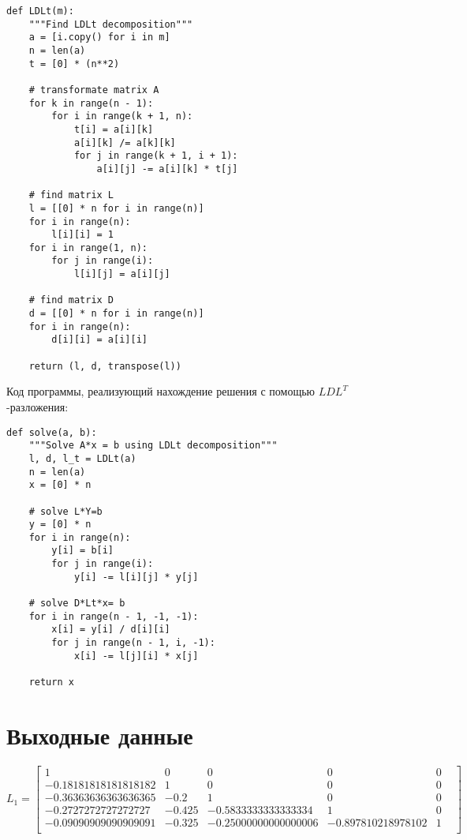 \documentclass[12pt]{report}
\begin{document}
\begin{lstlisting}
def LDLt(m):
    """Find LDLt decomposition"""
    a = [i.copy() for i in m]
    n = len(a)
    t = [0] * (n**2)

    # transformate matrix A
    for k in range(n - 1):
        for i in range(k + 1, n):
            t[i] = a[i][k]
            a[i][k] /= a[k][k]
            for j in range(k + 1, i + 1):
                a[i][j] -= a[i][k] * t[j]

    # find matrix L
    l = [[0] * n for i in range(n)]
    for i in range(n):
        l[i][i] = 1
    for i in range(1, n):
        for j in range(i):
            l[i][j] = a[i][j]

    # find matrix D
    d = [[0] * n for i in range(n)]
    for i in range(n):
        d[i][i] = a[i][i]

    return (l, d, transpose(l))
\end{lstlisting}

Код программы, реализующий нахождение решения с помощью $LDL^{T}$-разложения: 

\begin{lstlisting}
def solve(a, b):
    """Solve A*x = b using LDLt decomposition"""
    l, d, l_t = LDLt(a)
    n = len(a)
    x = [0] * n

    # solve L*Y=b
    y = [0] * n
    for i in range(n):
        y[i] = b[i]
        for j in range(i):
            y[i] -= l[i][j] * y[j]

    # solve D*Lt*x= b
    for i in range(n - 1, -1, -1):
        x[i] = y[i] / d[i][i]
        for j in range(n - 1, i, -1):
            x[i] -= l[j][i] * x[j]

    return x
\end{lstlisting}

\section{Выходные данные}

\hspace{-0.5cm}$L_{1} = 
\begin{bmatrix}
       1 &         0 &         0 &         0 &         0 & \\
-0.18181818181818182 &         1 &         0 &         0 &         0 & \\
-0.36363636363636365 &      -0.2 &         1 &         0 &         0 & \\
-0.2727272727272727 &    -0.425 &-0.5833333333333334 &         1 &         0 & \\
-0.09090909090909091 &    -0.325 &-0.25000000000000006 &-0.897810218978102 &         1 & \\
\end{bmatrix}
$
\end{document}
